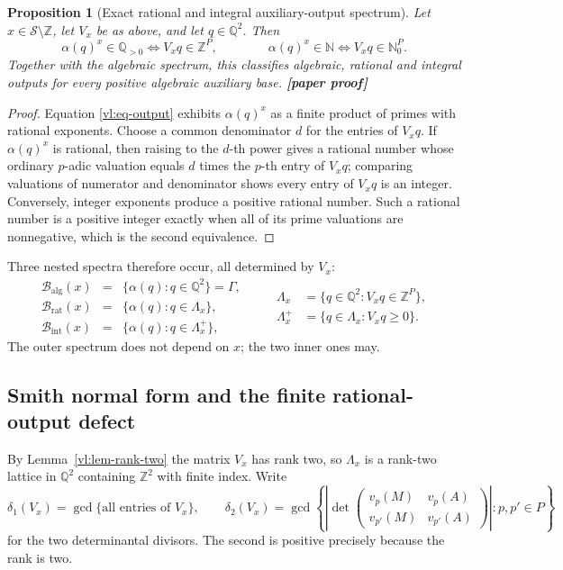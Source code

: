 \documentclass[11pt,oneside]{article}
\newtheorem{proposition}[theorem]{Proposition}
\theoremstyle{definition}
\theoremstyle{remark}
\newcommand{\N}{\mathbb N}
\newcommand{\Nzero}{\mathbb N_0}
\newcommand{\Z}{\mathbb Z}
\newcommand{\Q}{\mathbb Q}
\newcommand{\Sol}{\mathcal S}
\newcommand{\vpp}[2]{v_{#1}\!\left(#2\right)}
\newcommand{\GammaSat}{\Gamma}
\newcommand{\statusnew}{\textcolor{newgreen}{\textbf{[paper proof]}}}
\begin{document}
\begin{proposition}[Exact rational and integral auxiliary-output spectrum]
\label{vl:prop-spectrum}
Let $x\in\Sol\setminus\Z$, let $V_x$ be as above, and let $q\in\Q^2$.  Then
\[
 \alpha(q)^x\in\Q_{>0}
 \iff V_xq\in\Z^{P},
 \qquad\qquad
 \alpha(q)^x\in\N
 \iff V_xq\in\Nzero^{P}.
\]
Together with the algebraic spectrum, this classifies algebraic, rational and integral outputs
for every positive algebraic auxiliary base.  \statusnew
\end{proposition}

\begin{proof}
Equation \eqref{vl:eq-output} exhibits $\alpha(q)^x$ as a finite product of primes with
rational exponents.  Choose a common denominator $d$ for the entries of $V_xq$.  If
$\alpha(q)^x$ is rational, then raising to the $d$-th power gives a rational number whose
ordinary $p$-adic valuation equals $d$ times the $p$-th entry of $V_xq$; comparing valuations
of numerator and denominator shows every entry of $V_xq$ is an integer.  Conversely, integer
exponents produce a positive rational number.  Such a rational number is a positive integer
exactly when all of its prime valuations are nonnegative, which is the second equivalence.
\end{proof}

Three nested spectra therefore occur, all determined by $V_x$:
\[
 \begin{array}{rcl}
 \mathcal B_{\mathrm{alg}}(x)
  &=&\{\alpha(q):q\in\Q^2\}=\GammaSat,\\[2mm]
 \mathcal B_{\mathrm{rat}}(x)
  &=&\{\alpha(q):q\in\Lambda_x\},\\[1mm]
 \mathcal B_{\mathrm{int}}(x)
  &=&\{\alpha(q):q\in\Lambda_x^{+}\},
 \end{array}
 \qquad
 \begin{aligned}
 \Lambda_x&=\{q\in\Q^2:V_xq\in\Z^{P}\},\\[1mm]
 \Lambda_x^{+}&=\{q\in\Lambda_x:V_xq\ge0\}.
 \end{aligned}
\]
The outer spectrum does not depend on $x$; the two inner ones may.

\subsection{Smith normal form and the finite rational-output defect}

By Lemma~\ref{vl:lem-rank-two} the matrix $V_x$ has rank two, so $\Lambda_x$ is a rank-two
lattice in $\Q^2$ containing $\Z^2$ with finite index.  Write
\[
 \delta_1(V_x)=\gcd\{\text{all entries of }V_x\},
 \qquad
 \delta_2(V_x)=\gcd\left\{
  \left|\det\begin{pmatrix}
   \vpp{p}{M}&\vpp{p}{A}\\
   \vpp{p'}{M}&\vpp{p'}{A}
  \end{pmatrix}\right|
  :p,p'\in P\right\}
\]
for the two determinantal divisors.  The second is positive precisely because the rank is two.
\end{document}
